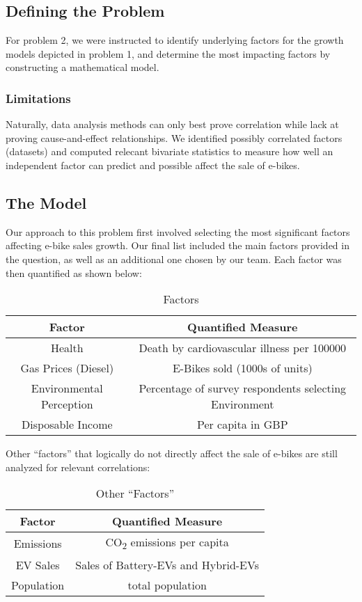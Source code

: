 \subsection{Defining the Problem}
For problem 2, we were instructed to identify underlying factors for the growth models depicted in problem 1, and determine the most impacting factors by constructing a mathematical model.

\subsubsection*{Limitations}

Naturally, data analysis methods can only best prove correlation while lack at proving cause-and-effect relationships.
We identified possibly correlated factors (datasets) and computed relecant bivariate statistics to measure how well an independent factor can predict and possible affect the sale of e-bikes.


\subsection{The Model}
Our approach to this problem first involved selecting the most significant factors affecting e-bike sales growth. Our final list included the main factors provided in the question, as well as an additional one chosen by our team. Each factor was then quantified as shown below:


\begin{table}[h!]
    \centering
    \begin{tabular}{cc}
        \toprule
        Factor & Quantified Measure      \\
        \midrule
        Health   & Death by cardiovascular illness per 100000     \\
        Gas Prices (Diesel) & E-Bikes sold (1000s of units)     \\
        Environmental Perception & Percentage of survey respondents selecting Environment\\
        Disposable Income & Per capita in GBP\\
        \bottomrule
    \end{tabular}
    \caption{Factors}
    \label{tab:factors}
\end{table}

Other ``factors'' that logically do not directly affect the sale of e-bikes are still analyzed for relevant correlations:

\begin{table}[h!]
    \centering
    \begin{tabular}{cc}
        \toprule
        Factor & Quantified Measure      \\
        \midrule
        Emissions   & CO\textsubscript{2} emissions per capita    \\
        EV Sales & Sales of Battery-EVs and Hybrid-EVs     \\
        Population & total population \\
        \bottomrule
    \end{tabular}
    \caption{Other ``Factors''}
    \label{tab:factors2}
\end{table}


